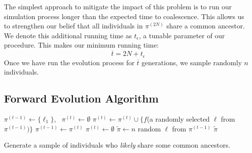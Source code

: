 The simplest approach to mitigate the impact of this problem is to run our simulation process longer than the expected
time to coalescence.
This allows us to strengthen our belief that all individuals in $\pi^{(2N)}$ share a common ancestor.
We denote this additional running time as $t_\epsilon$, a tunable parameter of our procedure.
This makes our minimum running time:
\begin{equation}
    \overbar{t} = 2N + t_\epsilon
\end{equation}
Once we have run the evolution process for $\overbar{t}$ generations, we sample randomly $n$ individuals.

\subsection{Forward Evolution Algorithm}\label{subsec:forwardEvolutionAlgorithm}
\begin{algorithm}[t]
    \SetAlgoLined
    \DontPrintSemicolon
     {
        $\pi^{(t-1)} \gets \{ \ell_1 \}$,  \
        $\pi^{(t)} \gets \emptyset$ \;
         {
             {
                $\pi^{(t)} \gets \pi^{(t)} \cup \{f$(a randomly selected $\ell$ from $\pi^{(t-1)} )\}$ \;
            }
            $\pi^{(t-1)} \gets \pi^{(t)}$ \;
            $\pi^{(t)} \gets \emptyset$ \;
        }
        $\tilde{\pi} \gets n$ random $\ell$ from $\pi^{(t-1)}$ \;
        \Return $\tilde{\pi}$ \;
    }
    \caption{Generate a sample of individuals who \emph{likely} share some common ancestors.}
    \label{alg:forwardEvolution}
\end{algorithm}


